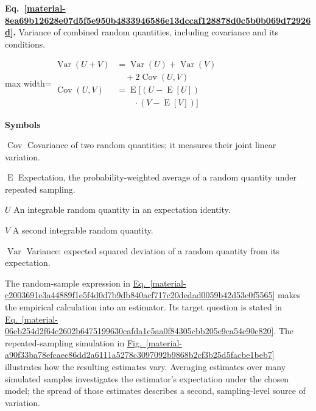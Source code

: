 \documentclass[11pt,a4paper]{article}
\begin{document}
\par\medskip
\noindent\begin{minipage}{\linewidth}
\label{material-8ea69b12628e07d5f5e950b4833946586e13dccaf128878d0c5b0b069d72926d}
\noindent\textbf{Eq.~\ref*{material-8ea69b12628e07d5f5e950b4833946586e13dccaf128878d0c5b0b069d72926d}.} Variance of combined random quantities, including covariance and its conditions.\par\nopagebreak
\begin{center}\begin{adjustbox}{max width=\linewidth}$\displaystyle \begin{aligned}\operatorname{Var}(U+V)&=\operatorname{Var}(U)+\operatorname{Var}(V)\\&\quad+2\operatorname{Cov}(U,V)\\\operatorname{Cov}(U,V)&=\operatorname{E}[(U-\operatorname{E}[U])\\&\qquad\cdot(V-\operatorname{E}[V])]\end{aligned}$\end{adjustbox}\end{center}

\par\noindent\textbf{Symbols}

\par\noindent\textbf{\(\operatorname{Cov}\)} Covariance of two random quantities; it measures their joint linear variation.

\par\noindent\textbf{\(\operatorname{E}\)} Expectation, the probability-weighted average of a random quantity under repeated sampling.

\par\noindent\textbf{\(U\)} An integrable random quantity in an expectation identity.

\par\noindent\textbf{\(V\)} A second integrable random quantity.

\par\noindent\textbf{\(\operatorname{Var}\)} Variance: expected squared deviation of a random quantity from its expectation.

\end{minipage}\par
\medskip

The random-sample expression in \hyperref[material-c2003691e3a44889f1e5f4d0d7b9db840acf717c20dedad0059b42d53e0f5565]{Eq.~\ref*{material-c2003691e3a44889f1e5f4d0d7b9db840acf717c20dedad0059b42d53e0f5565}} makes the empirical calculation into an estimator. Its target question is stated in \hyperref[material-06eb254d2f64c2602b6475199630cafda1c5aa0f84305cbb205e9ca54e90c820]{Eq.~\ref*{material-06eb254d2f64c2602b6475199630cafda1c5aa0f84305cbb205e9ca54e90c820}}. The repeated-sampling simulation in \hyperref[material-a90f33ba78efcaec86dd2a6111a5278c3097092b9868b2cf3b25d5facbe1beb7]{Fig.~\ref*{material-a90f33ba78efcaec86dd2a6111a5278c3097092b9868b2cf3b25d5facbe1beb7}} illustrates how the resulting estimates vary. Averaging estimates over many simulated samples investigates the estimator's expectation under the chosen model; the spread of those estimates describes a second, sampling-level source of variation.
\end{document}
